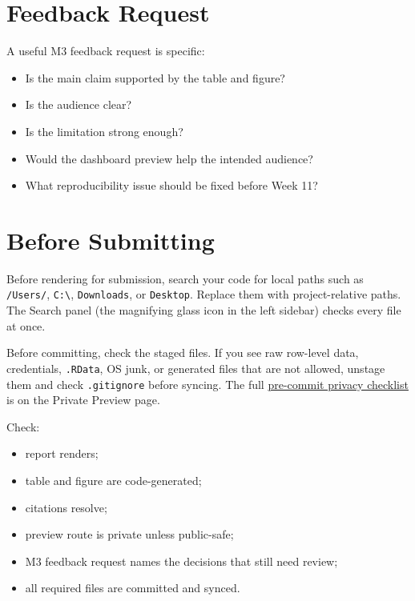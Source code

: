 \documentclass[
  letterpaper,
  DIV=11,
  numbers=noendperiod,
  oneside]{scrreprt}
\providecommand{\tightlist}{%
  \setlength{\itemsep}{0pt}\setlength{\parskip}{0pt}}
\begin{document}
\section*{Feedback Request}\label{feedback-request}


A useful M3 feedback request is specific:

\begin{itemize}
\tightlist
\item
  Is the main claim supported by the table and figure?
\item
  Is the audience clear?
\item
  Is the limitation strong enough?
\item
  Would the dashboard preview help the intended audience?
\item
  What reproducibility issue should be fixed before Week 11?
\end{itemize}

\section*{Before Submitting}\label{before-submitting-1}


Before rendering for submission, search your code for local paths such
as \texttt{/Users/}, \texttt{C:\textbackslash{}}, \texttt{Downloads}, or
\texttt{Desktop}. Replace them with project-relative paths. The Search
panel (the magnifying glass icon in the left sidebar) checks every file
at once.

Before committing, check the staged files. If you see raw row-level
data, credentials, \texttt{.RData}, OS junk, or generated files that are
not allowed, unstage them and check \texttt{.gitignore} before syncing.
The full \hyperref[private-preview]{pre-commit privacy checklist} is on
the Private Preview page.

Check:

\begin{itemize}
\tightlist
\item
  report renders;
\item
  table and figure are code-generated;
\item
  citations resolve;
\item
  preview route is private unless public-safe;
\item
  M3 feedback request names the decisions that still need review;
\item
  all required files are committed and synced.
\end{itemize}
\end{document}
